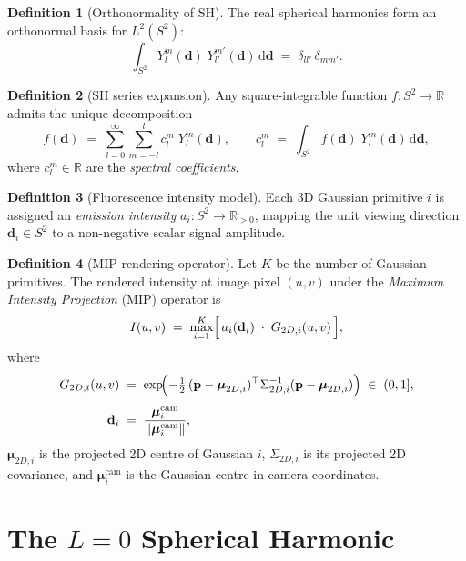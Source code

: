 \documentclass[12pt, a4paper]{article}
\theoremstyle{definition}
\newtheorem{definition}{Definition}[section]
\theoremstyle{plain}
\theoremstyle{remark}
\newcommand{\R}{\mathbb{R}}
\newcommand{\Stwo}{S^2}
\newcommand{\norm}[1]{\left\lVert#1\right\rVert}
\newcommand{\dd}{\,\mathrm{d}}
\begin{document}
\begin{definition}[Orthonormality of SH]
\label{def:ortho}
The real spherical harmonics form an orthonormal basis for
$L^2(\Stwo)$:
\[
  \int_{\Stwo} Y_l^m(\mathbf{d})\;Y_{l'}^{m'}(\mathbf{d})\dd\mathbf{d}
  \;=\;
  \delta_{ll'}\,\delta_{mm'}.
\]
\end{definition}

\begin{definition}[SH series expansion]
\label{def:shexp}
Any square-integrable function $f:\Stwo\to\R$ admits the unique
decomposition
\[
  f(\mathbf{d})
  \;=\;
  \sum_{l=0}^{\infty}\sum_{m=-l}^{l}
    c_l^m\;Y_l^m(\mathbf{d}),
  \qquad
  c_l^m \;=\; \int_{\Stwo} f(\mathbf{d})\;Y_l^m(\mathbf{d})\dd\mathbf{d},
\]
where $c_l^m\in\R$ are the \emph{spectral coefficients}.
\end{definition}

\begin{definition}[Fluorescence intensity model]
\label{def:intensity}
Each 3D Gaussian primitive $i$ is assigned an \emph{emission intensity}
$a_i : \Stwo \to \R_{>0}$, mapping the unit viewing direction
$\mathbf{d}_i\in\Stwo$ to a non-negative scalar signal amplitude.
\end{definition}

\begin{definition}[MIP rendering operator]
\label{def:mip}
Let $K$ be the number of Gaussian primitives.  The rendered intensity
at image pixel $(u,v)$ under the \emph{Maximum Intensity Projection}
(MIP) operator is
\[
  I(u,v)
  \;=\;
  \max_{i=1}^{K}
    \Bigl[\,a_i(\mathbf{d}_i)\;\cdot\;G_{2D,i}(u,v)\,\Bigr],
\]
where
\begin{align*}
  G_{2D,i}(u,v)
  &\;=\;
  \exp\!\Bigl(
    -\tfrac{1}{2}\,
    (\mathbf{p}-\boldsymbol{\mu}_{2D,i})^\top
    \Sigma_{2D,i}^{-1}
    (\mathbf{p}-\boldsymbol{\mu}_{2D,i})
  \Bigr)
  \;\in\;(0,1],\\[4pt]
  \mathbf{d}_i
  &\;=\;
  \frac{\boldsymbol{\mu}_i^{\mathrm{cam}}}
       {\norm{\boldsymbol{\mu}_i^{\mathrm{cam}}}},
\end{align*}
$\boldsymbol{\mu}_{2D,i}$ is the projected 2D centre of Gaussian $i$,
$\Sigma_{2D,i}$ is its projected 2D covariance, and
$\boldsymbol{\mu}_i^{\mathrm{cam}}$ is the Gaussian centre in camera
coordinates.
\end{definition}

\section{The \texorpdfstring{$L=0$}{L=0} Spherical Harmonic}
\end{document}
